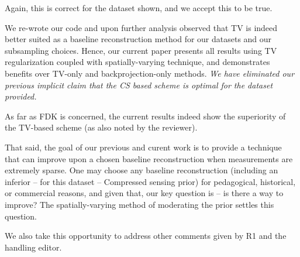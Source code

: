 \documentclass{article}
\begin{document}
Again, this is correct for the dataset shown, and we accept this to be
true.

  We re-wrote our code and upon further analysis observed that TV is
  indeed better suited as a baseline reconstruction method for our
  datasets and our subsampling choices. Hence, our current paper
  presents all results using TV regularization coupled with
  spatially-varying technique, and demonstrates  benefits over
  TV-only and backprojection-only methods.  \emph{We have eliminated our
  previous implicit claim that the CS based scheme is optimal for the
  dataset provided. }

  As far as FDK is concerned, the current results indeed show the
  superiority of the TV-based scheme (as also noted by the reviewer).

    That said, the goal of our previous and curent work is to provide
    a technique that can improve upon a chosen baseline reconstruction
    when measurements are extremely sparse.  One may choose any
    baseline reconstruction (including an inferior -- for this dataset
    -- Compressed sensing prior) for pedagogical, historical, or
    commercial reasons, and given that, our key question is -- is
    there a way to improve?  The spatially-varying method of
    moderating the prior settles this question.

We also take this opportunity to address other comments given by R1
and the handling editor.
\end{document}
